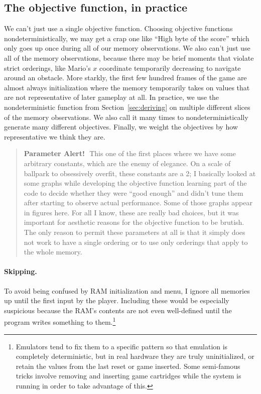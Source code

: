 \documentclass[twocolumn]{article}
\newcommand\parameteralert[1]{
  \begin{quotation}
  {\bf Parameter Alert!}\,\, #1
  \end{quotation}
}
\begin{document}
\subsection{The objective function, in practice}

We can't just use a single objective function. Choosing objective
functions nondeterministically, we may get a crap one like ``High byte
of the score'' which only goes up once during all of our memory
observations. We also can't just use all of the memory observations,
because there may be brief moments that violate strict orderings, like
Mario's $x$ coordinate temporarily decreasing to navigate around an
obstacle. More starkly, the first few hundred frames of the game are
almost always initialization where the memory temporarily takes on
values that are not representative of later gameplay at all. In
practice, we use the nondeterministic function from
Section~\ref{sec:deriving} on multiple different slices of the memory
observations. We also call it many times to nondeterministically
generate many different objectives. Finally, we weight the objectives
by how representative we think they are.

\parameteralert{This one of the first places where we have some
  arbitrary constants, which are the enemy of elegance. On a scale of
  ballpark to obsessively overfit, these constants are a 2; I
  basically looked at some graphs while developing the objective
  function learning part of the code to decide whether they were
  ``good enough'' and didn't tune them after starting to observe
  actual performance. Some of those graphs appear in figures here.
  For all I know, these are really bad choices, but it was important
  for aesthetic reasons for the objective function to be brutish. The
  only reason to permit these parameters at all is that it simply
  does not work to have a single ordering or to use only orderings
  that apply to the whole memory.}

\paragraph{Skipping.} To avoid being confused by RAM initialization and
menu, I ignore all memories up until the first input by the player.
Including these would be especially suspicious because the RAM's
contents are not even well-defined until the program writes something
to them.\footnote{Emulators tend to fix them to a specific pattern so
  that emulation is completely deterministic, but in real hardware
  they are truly uninitialized, or retain the values from the last
  reset or game inserted. Some semi-famous tricks involve removing and
  inserting game cartridges while the system is running in order to
  take advantage of this.}
\end{document}
